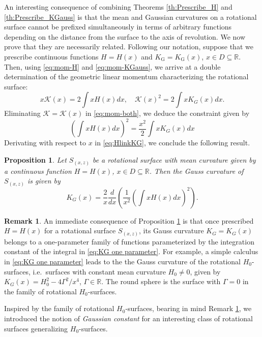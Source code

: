 \documentclass[leqno,11pt]{amsart}
\def\R{\mathbb{R}}
\newtheorem{proposition}[theorem]{Proposition}
\theoremstyle{definition}
\newtheorem{remark}[theorem]{Remark}
\numberwithin{equation}{section}
\begin{document}
An interesting consequence of combining Theorems \ref{th:Prescribe_H} and \ref{th:Prescribe_KGauss} is that the mean and Gaussian curvatures on a rotational surface cannot be prefixed simultaneously in terms of arbitrary functions depending on the distance from the surface to the axis of revolution. We now prove that they are necessarily related. Following our notation, suppose that we prescribe continuous functions $H=H(x)$ and $K_{\text{G}}=K_{\text{G}}(x)$, $x\in D \subseteq \R $. Then, using \eqref{eq:mom-H} and \eqref{eq:mom-KGauss}, we arrive at a double determination of the geometric linear momentum characterizing the rotational surface:
\begin{equation}\label{eq:mom-both}
	x\mathcal{K}(x)=2\int xH(x)dx, \quad 	\mathcal{K}(x)^2=2\int xK_G(x)dx.
\end{equation}
Eliminating $\mathcal K = \mathcal K(x)$ in \eqref{eq:mom-both}, we deduce the constraint given by
\begin{equation}\label{eq:HlinkKG}
\left(\int x H(x)dx\right)^2=\dfrac{x^2}{2}\int x K_G(x)dx
\end{equation}
Derivating with respect to $x$ in \eqref{eq:HlinkKG}, we conclude the following result.
\begin{proposition}\label{propo:KG from H}
Let $S_{(x,z)}$ be a rotational surface with mean curvature given by a continuous function $H=H(x)$, $x\in D \subseteq \R $. Then the Gauss curvature of $S_{(x,z)}$ is given by
\begin{equation}\label{eq:KG one parameter}
	K_G(x)=\dfrac{2}{x}\dfrac{d}{d x}\left(\dfrac{1}{x^2}\left(\int x H(x)dx\right)^2\right).
\end{equation}
\end{proposition}
\begin{remark}\label{re:KG uniparametric}
	An immediate consequence of Proposition \ref{propo:KG from H} is that once prescribed $H=H(x)$ for a rotational surface $S_{(x,z)}$, its Gauss curvature $K_G=K_G(x)$ belongs to a one-parameter family of functions parameterized by the integration constant of the integral in \eqref{eq:KG one parameter}. For example, a simple calculus in \eqref{eq:KG one parameter} leads to the the Gauss curvature of the rotational $H_0$-surfaces, i.e.\ surfaces with constant mean curvature $H_0\neq 0$, given by $K_G(x)=H_0^2-4\Gamma^2/x^4$, $\Gamma\in \R$. The round sphere is the surface with $\Gamma =0$ in the family of rotational $H_0$-surfaces.
\end{remark}
Inspired by the family of rotational $H_0$-surfaces, bearing in mind Remark \ref{re:KG uniparametric}, we introduced the notion of \textit{Gaussian constant} for an interesting class of rotational surfaces generalizing $H_0$-surfaces.
\end{document}
